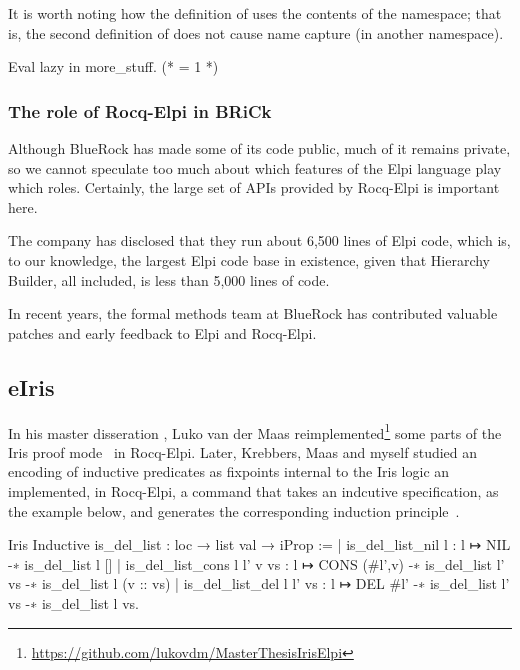 \documentclass{these-ISSS}
\newenvironment{rocqcode}
  {\VerbatimEnvironment\begin{rocqbox}\begin{xrocqcode}}{\end{xrocqcode}
\end{rocqbox}}
\begin{document}
It is worth noting how the definition of  uses the contents
of the namespace; that is, the second definition of  does not
cause name capture (in another namespace).

\begin{rocqcode}
Eval lazy in more_stuff. (* = 1 *)
\end{rocqcode}

\subsubsection{The role of Rocq-Elpi in BRiCk}

Although BlueRock has made some of its code public, much of it remains
private, so we cannot speculate too much about which features of the Elpi
language play which roles. Certainly, the large set of APIs provided by
Rocq-Elpi is important here.

The company has disclosed that they run about 6,500 lines of Elpi code, which
is, to our knowledge, the largest Elpi code base in existence, given that
Hierarchy Builder, all included, is less than 5,000 lines of code.

In recent years, the formal methods team at BlueRock has contributed valuable
patches and early feedback to Elpi and Rocq-Elpi.

\subsection{eIris}

In his master disseration \cite{Maas2024}, Luko van der Maas reimplemented\footnote{\url{https://github.com/lukovdm/MasterThesisIrisElpi}}
some parts of the Iris proof mode~\cite{10.1007/978-3-662-54434-1_26} in
Rocq-Elpi. Later, Krebbers, Maas and myself studied an encoding of inductive
predicates as fixpoints internal to the Iris logic an implemented,
in Rocq-Elpi, a command that takes an indcutive specification, as the example
below, and generates the corresponding induction principle~\cite{krebbers25}.

\begin{rocqcode}
Iris Inductive is_del_list : loc → list val → iProp :=
| is_del_list_nil l : l ↦ NIL -∗ is_del_list l []
| is_del_list_cons l l' v vs :
    l ↦ CONS (#l',v) -∗ is_del_list l' vs -∗ is_del_list l (v :: vs)
| is_del_list_del l l' vs :
    l ↦ DEL #l' -∗ is_del_list l' vs -∗ is_del_list l vs.
\end{rocqcode}
\end{document}
